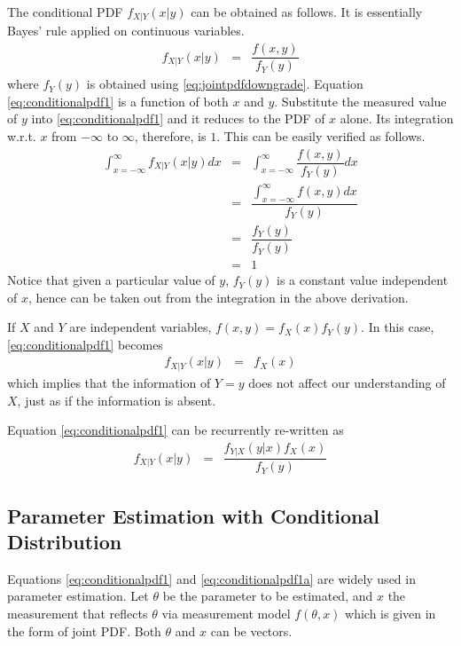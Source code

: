 The conditional PDF $f_{X|Y}(x|y)$ can be obtained as follows. It is essentially Bayes' rule applied on continuous variables.
\begin{eqnarray}
  f_{X|Y}(x|y) &=& \dfrac{f(x, y)}{f_Y(y)} \label{eq:conditionalpdf1}
\end{eqnarray}
where $f_Y(y)$ is obtained using \eqref{eq:jointpdfdowngrade}. Equation \eqref{eq:conditionalpdf1} is a function of both $x$ and $y$. Substitute the measured value of $y$ into \eqref{eq:conditionalpdf1} and it reduces to the PDF of $x$ alone. Its integration w.r.t. $x$ from $-\infty$ to $\infty$, therefore, is $1$. This can be easily verified as follows.
\begin{eqnarray}
  \int_{x=-\infty}^{\infty}f_{X|Y}(x|y)dx &=& \int_{x=-\infty}^{\infty}\dfrac{f(x, y)}{f_Y(y)}dx \nonumber \\
  &=& \dfrac{\int_{x=-\infty}^{\infty}f(x, y)dx}{f_Y(y)} \nonumber \\
  &=& \dfrac{f_Y(y)}{f_Y(y)} \nonumber \\
  &=& 1 \nonumber
\end{eqnarray}
Notice that given a particular value of $y$, $f_Y(y)$ is a constant value independent of $x$, hence can be taken out from the integration in the above derivation.

If $X$ and $Y$ are independent variables, $f(x,y) = f_X(x)f_Y(y)$. In this case, \eqref{eq:conditionalpdf1} becomes
\begin{eqnarray}
  f_{X|Y}(x|y) &=& f_X(x) \nonumber
\end{eqnarray}
which implies that the information of $Y=y$ does not affect our understanding of $X$, just as if the information is absent.

Equation \eqref{eq:conditionalpdf1} can be recurrently re-written as
\begin{eqnarray}
f_{X|Y}(x|y) &=& \dfrac{f_{Y|X}(y|x)f_X(x)}{f_Y(y)} \label{eq:conditionalpdf1a}
\end{eqnarray}

\subsection{Parameter Estimation with Conditional Distribution}

Equations \eqref{eq:conditionalpdf1} and \eqref{eq:conditionalpdf1a} are widely used in parameter estimation. Let $\theta$ be the parameter to be estimated, and $x$ the measurement that reflects $\theta$ via measurement model $f(\theta, x)$ which is given in the form of joint PDF. Both $\theta$ and $x$ can be vectors.

